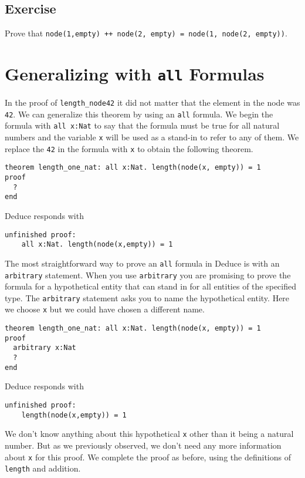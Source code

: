\documentclass[12pt]{article}
\begin{document}
\subsection*{Exercise}

Prove that \texttt{node(1,empty) ++ node(2, empty) = node(1, node(2, empty))}.


\section{Generalizing with \texttt{all} Formulas}

In the proof of \texttt{length\_node42} it did not matter that the
element in the node was \texttt{42}. We can generalize this theorem by
using an \texttt{all} formula. We begin the formula with \texttt{all
  x:Nat} to say that the formula must be true for all natural numbers
and the variable \texttt{x} will be used as a stand-in to refer to any
of them.  We replace the \texttt{42} in the formula with \texttt{x} to
obtain the following theorem.

\begin{verbatim}
theorem length_one_nat: all x:Nat. length(node(x, empty)) = 1
proof
  ?
end
\end{verbatim}
Deduce responds with
\begin{verbatim}
unfinished proof:
    all x:Nat. length(node(x,empty)) = 1
\end{verbatim}

The most straightforward way to prove an \texttt{all} formula in
Deduce is with an \texttt{arbitrary} statement. When you use
\texttt{arbitrary} you are promising to prove the formula for a
hypothetical entity that can stand in for all entities of the
specified type. The \texttt{arbitrary} statement asks you to name the
hypothetical entity. Here we choose \texttt{x} but we could have
chosen a different name.

\begin{verbatim}
theorem length_one_nat: all x:Nat. length(node(x, empty)) = 1
proof
  arbitrary x:Nat
  ?
end
\end{verbatim}

\noindent Deduce responds with

\begin{verbatim}
unfinished proof:
    length(node(x,empty)) = 1
\end{verbatim}

We don't know anything about this hypothetical \texttt{x} other than
it being a natural number. But as we previously observed, we don't
need any more information about \texttt{x} for this proof.  We
complete the proof as before, using the definitions of \texttt{length}
and addition.
\end{document}
